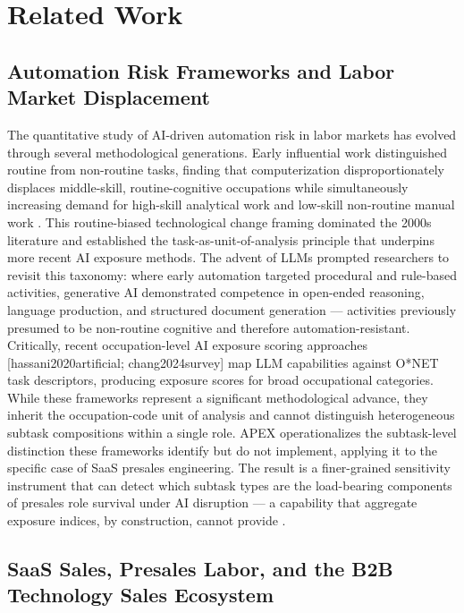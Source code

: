 \documentclass[10pt, conference]{IEEEtran}
\begin{document}
\section{Related Work}

\label{sec:related_work}

\subsection{Automation Risk Frameworks and Labor Market Displacement}

\label{sec:automation_risk_frameworks_and_labor_mar}

The quantitative study of AI-driven automation risk in labor markets has evolved through several methodological generations. Early influential work distinguished routine from non-routine tasks, finding that computerization disproportionately displaces middle-skill, routine-cognitive occupations while simultaneously increasing demand for high-skill analytical work and low-skill non-routine manual work \cite{santana2020future}. This routine-biased technological change framing dominated the 2000s literature and established the task-as-unit-of-analysis principle that underpins more recent AI exposure methods. The advent of LLMs prompted researchers to revisit this taxonomy: where early automation targeted procedural and rule-based activities, generative AI demonstrated competence in open-ended reasoning, language production, and structured document generation --- activities previously presumed to be non-routine cognitive and therefore automation-resistant. Critically, recent occupation-level AI exposure scoring approaches [hassani2020artificial; chang2024survey] map LLM capabilities against O*NET task descriptors, producing exposure scores for broad occupational categories. While these frameworks represent a significant methodological advance, they inherit the occupation-code unit of analysis and cannot distinguish heterogeneous subtask compositions within a single role. APEX operationalizes the subtask-level distinction these frameworks identify but do not implement, applying it to the specific case of SaaS presales engineering. The result is a finer-grained sensitivity instrument that can detect which subtask types are the load-bearing components of presales role survival under AI disruption --- a capability that aggregate exposure indices, by construction, cannot provide \cite{martinezplumed2020futures}.

\subsection{SaaS Sales, Presales Labor, and the B2B Technology Sales Ecosystem}
\end{document}
